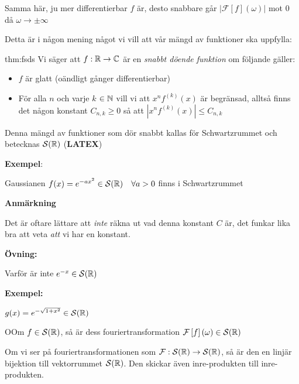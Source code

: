 \noindent Samma här, ju mer differentierbar $f$ är, desto snabbare går $\left|\mathcal{F}\left[f\right](\omega)\right|$ mot 0 då $\omega\to\pm\infty$
\par\bigskip
\noindent Detta är i någon mening något vi vill att vår mängd av funktioner ska uppfylla:
\par\bigskip
\begin{theo}{thm:fsds}
  Vi säger att $f:\mathbb{R}\to\mathbb{C}$ är en \textit{snabbt döende funktion} om följande gäller:\par
  \begin{itemize}
    \item $f$ är glatt (oändligt gånger differentierbar)
      \par\bigskip
    \item För alla $n$ och varje $k$ $\in\mathbb{N}$ vill vi att $x^nf^{(k)}(x)$ är begränsad, alltså finns det någon konstant $C_{n,k}\geq0$ så att $\left|x^nf^{(k)}(x)\right|\leq C_{n,k}$
  \end{itemize}
\end{theo}
\par\bigskip
\noindent Denna mängd av funktioner som dör snabbt kallas för Schwartzrummet och betecknas $\mathcal{S}(\mathbb{R})$ (\textbf{LATEX})
\par\bigskip
\noindent\textbf{Exempel}:\par
\noindent Gaussianen $f(x) = e^{-ax^2}\in\mathcal{S}(\mathbb{R})\quad\forall a>0$ finns i Schwartzrummet  
\par\bigskip
\noindent\textbf{Anmärkning}\par
\noindent Det är oftare lättare att \textit{inte} räkna ut vad denna konstant $C$ är, det funkar lika bra att veta \textit{att} vi har en konstant.
\par\bigskip
\noindent\textbf{Övning:}\par
\noindent Varför är inte $e^{-x}\in\mathcal{S}(\mathbb{R})$ 
\par\bigskip
\noindent\textbf{Exempel:}\par
\noindent $g(x) = e^{-\sqrt{1+x^2}}\in\mathcal{S}(\mathbb{R})$
\par\bigskip
\begin{theo}
  OOm $f\in\mathcal{S}(\mathbb{R})$, så är dess fouriertransformation $\mathcal{F}\left[f\right](\omega)\in\mathcal{S}(\mathbb{R})$
  \par\bigskip
  \noindent Om vi ser på fouriertransformationen som $\mathcal{F}:\mathcal{S}(\mathbb{R})\to\mathcal{S}(\mathbb{R})$, så är den en linjär bijektion till vektorrummet $\mathcal{S}(\mathbb{R})$. Den skickar även inre-produkten till inre-produkten. \par
\end{theo}
